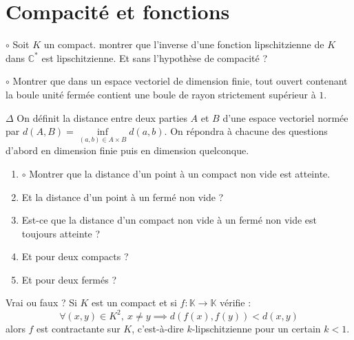 \documentclass[french,a4paper]{article}
\newcommand{\C}{\mathbb{C}}
\newcommand{\K}{\mathbb{K}}
\newcommand{\st}{^*}
\theoremstyle{plain}
\theoremstyle{definition}
\theoremstyle{remark}
\begin{document}
\section{Compacité et fonctions}

\begin{ex}[Moulin.14]{$\circ$}
	Soit $K$ un compact. montrer que l'inverse d'une fonction lipschitzienne de $K$ dans $\C\st$ est lipschitzienne. Et sans l'hypothèse de compacité ?
\end{ex}

\begin{ex}[Moulin.15]{$\circ$}
	Montrer que dans un espace vectoriel de dimension finie, tout ouvert contenant la boule unité fermée contient une boule de rayon strictement supérieur à $1$.
\end{ex}

\begin{ex}[Moulin.16]{$\Delta$}
	On définit la distance entre deux parties $A$ et $B$ d'une espace vectoriel normée par $d(A,B)=\displaystyle\underset{(a,b)\in A\times B}{\inf}d(a,b)$. On répondra à chacune des questions d'abord en dimension finie puis en dimension quelconque.
	\begin{enumerate}
		\item $\circ$ Montrer que la distance d'un point à un compact non vide est atteinte.
		\item Et la distance d'un point à un fermé non vide ?
		\item Est-ce que la distance d'un compact non vide à un fermé non vide est toujours atteinte ?
		\item Et pour deux compacts ?
		\item Et pour deux fermés ?
	\end{enumerate}
\end{ex}

\begin{ex}[Moulin.17]{}
	Vrai ou faux ? Si $K$ est un compact et si $f:\K\to\K$ vérifie : $$\forall (x,y)\in K^2,\ x\ne y\implies d(f(x),f(y))<d(x,y)$$ alors $f$ est contractante sur $K$, c'est-à-dire $k$-lipschitzienne pour un certain $k<1$.
\end{ex}
\end{document}
